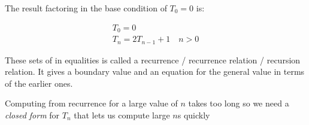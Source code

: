 \documentclass[12pt letter]{report}
\begin{document}
The result factoring in the base condition of $T_0 = 0$ is:

\begin{gather*}
	T_0 = 0\\
	T_n = 2T_{n-1} + 1 \quad n > 0
\end{gather*}

These sets of in equalities is called a recurrence / recurrence relation / recursion relation. It gives a boundary value
and an equation for the general value in terms of the earlier ones.

Computing from recurrence for a large value of $n$ takes too long so we need a \textit{closed form} for $T_n$ that lets
us compute large $n$s quickly
\end{document}
